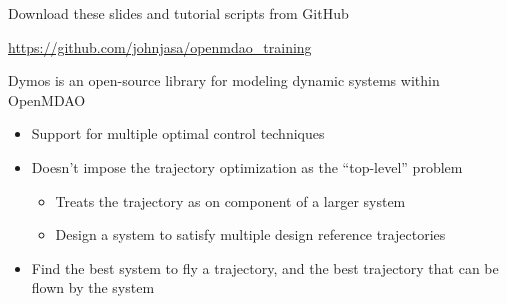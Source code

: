 \documentclass[aspectratio=169, usenames,dvipsnames, 14pt]{beamer}
\begin{document}
\begin{frame}{Download these slides and tutorial scripts from GitHub}

    \centering
    \url{https://github.com/johnjasa/openmdao\_training}

\end{frame}


%    

\begin{frame}{Dymos is an open-source library for modeling dynamic systems within OpenMDAO}
    \begin{itemize}
        \item Support for multiple optimal control techniques
        \vspace{0.25cm}
        \item Doesn't impose the trajectory optimization as the ``top-level'' problem
        \vspace{0.25cm}
        	\begin{itemize}
        	  \item Treats the trajectory as on component of a larger system
    		  \vspace{0.25cm}
		      \item Design a system to satisfy multiple design reference trajectories
		    \end{itemize}
        \vspace{0.25cm}
		\item Find the best system to fly a trajectory, and the best trajectory that can be flown by the system
    \end{itemize}
\end{frame}
\end{document}
